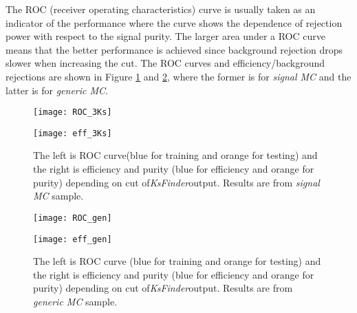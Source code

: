 The ROC (receiver operating characteristics) curve is usually taken as an indicator of the performance where the curve shows the dependence of rejection power with respect to the signal purity. The larger area under a ROC curve means that the better performance is achieved since background rejection drops slower when increasing the cut. The ROC curves and efficiency/background rejections are shown in Figure \ref{fig:3Ks_performance} and \ref{fig:gen_performance}, where the former is for \textit{signal MC} and the latter is for \textit{generic MC}.

\begin{figure}[H]
	\begin{minipage}[b]{0.5\linewidth}
		\centering 
		\texttt{[image: ROC\_3Ks]}
		\label{fig:ROC_3Ks}
	\end{minipage}
	\begin{minipage}[b]{0.5\linewidth}
		\centering 
		\texttt{[image: eff\_3Ks]}
		\label{fig:eff_3Ks}
	\end{minipage}
\caption{The left is ROC curve(blue for training and orange for testing) and the right is efficiency and purity (blue for efficiency and orange for purity) depending on cut of\textit{KsFinder}output. Results are from \textit{signal MC} sample.}
\label{fig:3Ks_performance}
\end{figure}

\begin{figure}[H]
	\begin{minipage}[b]{0.5\linewidth}
		\centering 
		\texttt{[image: ROC\_gen]}
	\end{minipage}
	\begin{minipage}[b]{0.5\linewidth}
		\centering 
		\texttt{[image: eff\_gen]}
	\end{minipage}
	\caption{The left is ROC curve (blue for training and orange for testing) and the right is efficiency and purity (blue for efficiency and orange for purity) depending on cut of\textit{KsFinder}output. Results are from \textit{generic MC} sample.}
	\label{fig:gen_performance}
\end{figure}

\begin{comment}
\begin{figure}[H]
	\begin{minipage}[b]{0.5\linewidth}
		\centering 
		\texttt{[image: jpsi-jpsi]}
		\label{fig:side:a}
	\end{minipage}
	\begin{minipage}[b]{0.5\linewidth}
		\centering 
		\texttt{[image: jpsi-jpsi-pur]}
		\label{fig:side:b}
	\end{minipage}
	\caption{The left is ROC curve and the right is efficiency and purity depending on cut of classifier output. Results are from $B^0 \to J/\psi K_S^0$ generic decay sample.}
\end{figure}
\end{comment}


